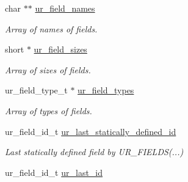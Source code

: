 \begin{DoxyCompactItemize}
\item 
char $\ast$$\ast$ \hyperlink{structur__field__specs__t_a9ef90bbaacc4b629a182cca2fe3f6ed3}{ur\+\_\+field\+\_\+names}\hypertarget{structur__field__specs__t_a9ef90bbaacc4b629a182cca2fe3f6ed3}{}\label{structur__field__specs__t_a9ef90bbaacc4b629a182cca2fe3f6ed3}

\begin{DoxyCompactList}\small\item\em Array of names of fields. \end{DoxyCompactList}\item 
short $\ast$ \hyperlink{structur__field__specs__t_a91ce0528dfa853da3ca1dcd377a1ceeb}{ur\+\_\+field\+\_\+sizes}\hypertarget{structur__field__specs__t_a91ce0528dfa853da3ca1dcd377a1ceeb}{}\label{structur__field__specs__t_a91ce0528dfa853da3ca1dcd377a1ceeb}

\begin{DoxyCompactList}\small\item\em Array of sizes of fields. \end{DoxyCompactList}\item 
ur\+\_\+field\+\_\+type\+\_\+t $\ast$ \hyperlink{structur__field__specs__t_a34d9bd7272e5f6d60ba60afef4d59e82}{ur\+\_\+field\+\_\+types}\hypertarget{structur__field__specs__t_a34d9bd7272e5f6d60ba60afef4d59e82}{}\label{structur__field__specs__t_a34d9bd7272e5f6d60ba60afef4d59e82}

\begin{DoxyCompactList}\small\item\em Array of types of fields. \end{DoxyCompactList}\item 
ur\+\_\+field\+\_\+id\+\_\+t \hyperlink{structur__field__specs__t_a2e28bd09fc5056730e543d023cf0a2da}{ur\+\_\+last\+\_\+statically\+\_\+defined\+\_\+id}\hypertarget{structur__field__specs__t_a2e28bd09fc5056730e543d023cf0a2da}{}\label{structur__field__specs__t_a2e28bd09fc5056730e543d023cf0a2da}

\begin{DoxyCompactList}\small\item\em Last statically defined field by U\+R\+\_\+\+F\+I\+E\+L\+DS(...) \end{DoxyCompactList}\item 
ur\+\_\+field\+\_\+id\+\_\+t \hyperlink{structur__field__specs__t_a0876b58dc84e725e78e94f0081e25c67}{ur\+\_\+last\+\_\+id}\hypertarget{structur__field__specs__t_a0876b58dc84e725e78e94f0081e25c67}{}\label{structur__field__specs__t_a0876b58dc84e725e78e94f0081e25c67}


\end{DoxyCompactItemize}
